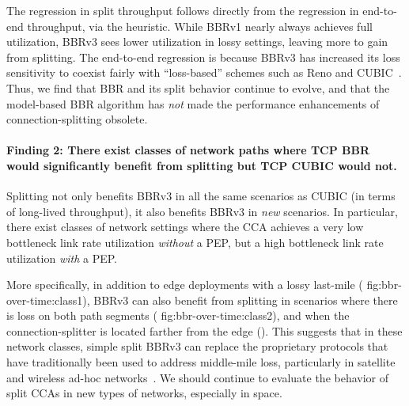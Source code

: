 The regression in split throughput follows directly from the regression
in end-to-end throughput, via the heuristic. While BBRv1 nearly always achieves
full utilization, BBRv3 sees lower utilization in lossy
settings, leaving more to gain from splitting.
The end-to-end regression is because BBRv3 has increased its loss sensitivity
to coexist fairly with ``loss-based'' schemes such as Reno and
CUBIC~\cite{cardwell2024bbrv3-ietf119,ware2019modeling,zeynali2024promises}.
Thus, we find that BBR and its split behavior continue
to evolve, and that the model-based BBR algorithm has \textit{not} made the
performance enhancements of connection-splitting obsolete.

\paragraph{Finding 2: There exist classes of network paths where TCP BBR would
 significantly benefit from splitting but TCP CUBIC would not.}

Splitting not only benefits BBRv3 in all the same scenarios as CUBIC (in terms
of long-lived throughput), it also benefits BBRv3 in \textit{new} scenarios. In
particular, there exist classes of network settings where the CCA achieves a
very low bottleneck link rate utilization \textit{without} a PEP, but a high
bottleneck link rate utilization \textit{with} a PEP.

More specifically, in addition to edge deployments with a lossy last-mile (\Cref
{fig:bbr-over-time:class1}), BBRv3 can also benefit from splitting in
scenarios where there is loss on both path segments (\Cref
{fig:bbr-over-time:class2}), and when the connection-splitter is located
farther from the edge (). This suggests that in
these network classes, simple split BBRv3 can replace the
proprietary protocols that have traditionally been used to address middle-mile
loss, particularly in satellite and wireless ad-hoc networks~\cite
{cloudsplitting2010,border2022evaluating,rfc3135}. We should continue to
evaluate the behavior of split CCAs in new types of networks, especially in
space.

